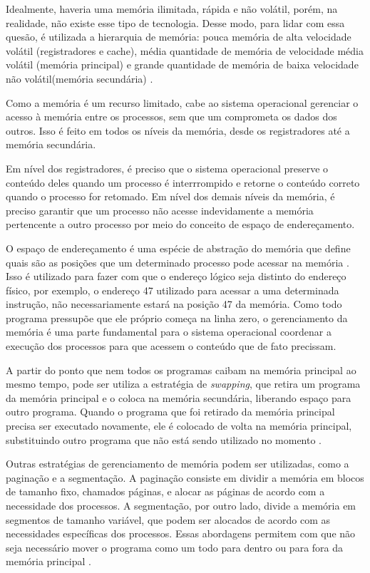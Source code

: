\documentclass[
	12pt,				%
	oneside,
	a4paper,			%
	english,			%
	french,				%
	spanish,			%
	brazil,				%
	]{abntex2}
\begin{document}
Idealmente, haveria uma memória ilimitada, rápida e não volátil, porém, na realidade, não existe esse tipo de tecnologia. Desse modo, para lidar com  essa quesão, é utilizada a hierarquia de memória: pouca memória de alta velocidade volátil (registradores e cache), média quantidade de memória de velocidade média volátil (memória principal) e grande quantidade de memória de baixa velocidade não volátil(memória secundária) \cite{tanenbaum2016sistemas}.

Como a memória é um recurso limitado, cabe ao sistema operacional gerenciar o acesso à memória entre os processos, sem que um comprometa os dados dos outros. Isso é feito em todos os níveis da memória, desde os registradores até a memória secundária. 

Em nível dos registradores, é preciso que o sistema operacional preserve o conteúdo deles quando um processo é interrrompido e retorne o conteúdo correto quando o processo for retomado. Em nível dos demais níveis da memória, é preciso garantir que um processo não acesse indevidamente a memória pertencente a outro processo por meio do conceito de espaço de endereçamento.

O espaço de endereçamento é uma espécie de abstração do memória que define quais são as posições que um determinado processo pode acessar na memória \cite{tanenbaum2016sistemas}. Isso é utilizado para fazer com que o endereço lógico seja distinto do endereço físico, por exemplo, o endereço 47 utilizado para acessar a uma determinada instrução, não necessariamente estará na posição 47 da memória. Como todo programa pressupõe que ele próprio começa na linha zero, o gerenciamento da memória é uma parte fundamental para o sistema operacional coordenar a execução dos processos para que acessem o conteúdo que de fato precissam.

A partir do ponto que nem todos os programas caibam na memória principal ao mesmo tempo, pode ser utiliza a estratégia de \textit{swapping}, que retira um programa da memória principal e o coloca na memória secundária, liberando espaço para outro programa. Quando o programa que foi retirado da memória principal precisa ser executado novamente, ele é colocado de volta na memória principal, substituindo outro programa que não está sendo utilizado no momento \cite{tanenbaum2016sistemas}.

Outras estratégias de gerenciamento de memória podem ser utilizadas, como a paginação e a segmentação. A paginação consiste em dividir a memória em blocos de tamanho fixo, chamados páginas, e alocar as páginas de acordo com a necessidade dos processos. A segmentação, por outro lado, divide a memória em segmentos de tamanho variável, que podem ser alocados de acordo com as necessidades específicas dos processos. Essas abordagens permitem com que não seja necessário mover o programa como um todo para dentro ou para fora da memória principal \cite{tanenbaum2016sistemas}.
\end{document}
